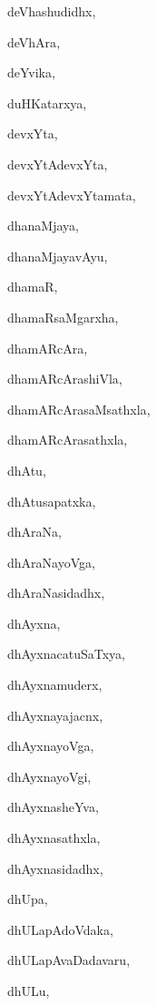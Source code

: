 \begin{multicols}{2}
{deVhashudidhx}, \pageref{deVhashudidhx}

{deVhAra}, \pageref{deVhAra}

{deYvika}, \pageref{deYvika}

{duHKatarxya}, \pageref{duHKatarxya}

{devxYta}, \pageref{devxYta}

{devxYtAdevxYta}, \pageref{devxYtAdevxYta}

{devxYtAdevxYtamata}, \pageref{devxYtAdevxYtamata}

{dhanaMjaya}, \pageref{dhanaMjaya}

{dhanaMjayavAyu}, \pageref{dhanaMjayavAyu}

{dhamaR}, \pageref{dhamaR}

{dhamaRsaMgarxha}, \pageref{dhamaRsaMgarxha}

{dhamARcAra}, \pageref{dhamARcAra}

{dhamARcArashiVla}, \pageref{dhamARcArashiVla}

{dhamARcArasaMsathxla}, \pageref{dhamARcArasaMsathxla}

{dhamARcArasathxla}, \pageref{dhamARcArasathxla}

{dhAtu}, \pageref{dhAtu}

{dhAtusapatxka}, \pageref{dhAtusapatxka}

{dhAraNa}, \pageref{dhAraNa}

{dhAraNayoVga}, \pageref{dhAraNayoVga}

{dhAraNasidadhx}, \pageref{dhAraNasidadhx}

{dhAyxna}, \pageref{dhAyxna}

{dhAyxnacatuSaTxya}, \pageref{dhAyxnacatuSaTxya}

{dhAyxnamuderx}, \pageref{dhAyxnamuderx}

{dhAyxnayajacnx}, \pageref{dhAyxnayajacnx}

{dhAyxnayoVga}, \pageref{dhAyxnayoVga}

{dhAyxnayoVgi}, \pageref{dhAyxnayoVgi}

{dhAyxnasheYva}, \pageref{dhAyxnasheYva}

{dhAyxnasathxla}, \pageref{dhAyxnasathxla}

{dhAyxnasidadhx}, \pageref{dhAyxnasidadhx}

{dhUpa}, \pageref{dhUpa}

{dhULapAdoVdaka}, \pageref{dhULapAdoVdaka}

{dhULapAvaDadavaru}, \pageref{dhULapAvaDadavaru}

{dhULu}, \pageref{dhULu}


\end{multicols}
